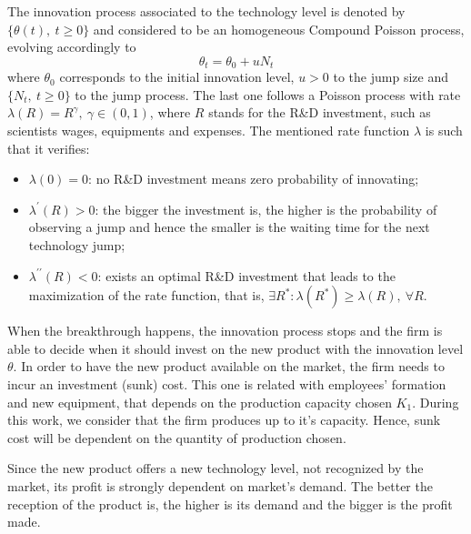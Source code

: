 The innovation process associated to the technology level is denoted by $\{ \theta(t), \ t \geq 0 \}$ and considered to be an homogeneous Compound Poisson process, evolving accordingly to
$$\theta_t= \theta_0+ u N_t$$  
where $\theta_0$ corresponds to the initial innovation level, $u > 0$ to the jump size and $\{N_t, \ t \geq 0\}$  to the jump process. The last one follows a Poisson process with rate $\lambda(R)=R^\gamma, \ \gamma \in (0,1)$, where $R$ stands for the R\&D investment, such as scientists wages, equipments and expenses. The mentioned rate function $\lambda$ is such that it verifies:
\begin{itemize}
	\item $\lambda(0) = 0$: no R\&D investment means zero probability of innovating;
	\item $\lambda^\prime (R)>0$: the bigger the investment is, the higher is the probability of observing a jump and hence the smaller is the waiting time for the next technology jump;
	\item $ \lambda ^{ \prime \prime} (R)<0$: exists an optimal R\&D investment that leads to the maximization of the rate function, that is, $\exists R^*: \lambda(R^*)\geq \lambda(R), \  \forall R$.
\end{itemize}


When the breakthrough happens, the innovation process stops and the firm is able to decide when it should invest on the new product with the innovation level $\theta$. In order to have the new product available on the market, the firm needs to incur an investment (sunk) cost. This one is related with employees' formation and new equipment, that depends on the production capacity chosen $K_1$. During this work, we consider that the firm produces up to it's capacity. Hence, sunk cost will be dependent on the quantity of production chosen.

Since the new product offers a new technology level, not recognized by the market, its profit is strongly dependent on market's demand. The better the reception of the product is, the higher is its demand and the bigger is the profit made. 


